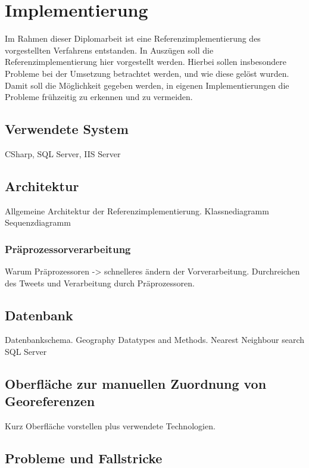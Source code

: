 \chapter{Implementierung} 
	
	Im Rahmen dieser Diplomarbeit ist eine Referenzimplementierung des vorgestellten Verfahrens entstanden.
	In Auszügen soll die Referenzimplementierung hier vorgestellt werden. 
	Hierbei sollen insbesondere Probleme bei der Umsetzung betrachtet werden, und wie diese gelöst wurden. 
	Damit soll die Möglichkeit gegeben werden, in eigenen Implementierungen die Probleme frühzeitig zu erkennen und zu vermeiden.  



	\section{Verwendete System}
		CSharp, SQL Server, IIS Server 

	\section{Architektur}
		
		Allgemeine Architektur der Referenzimplementierung.
		Klassnediagramm
		Sequenzdiagramm

		\subsection{Präprozessorverarbeitung}
			
			Warum Präprozessoren -> schnelleres ändern der Vorverarbeitung.
			Durchreichen des Tweets und Verarbeitung durch Präprozessoren.

	\section{Datenbank}
		
		Datenbankschema.
		Geography Datatypes and Methods.
		Nearest Neighbour search SQL Server

	\section{Oberfläche zur manuellen Zuordnung von Georeferenzen}

		Kurz Oberfläche vorstellen plus verwendete Technologien. 

	\section{Probleme und Fallstricke} 



